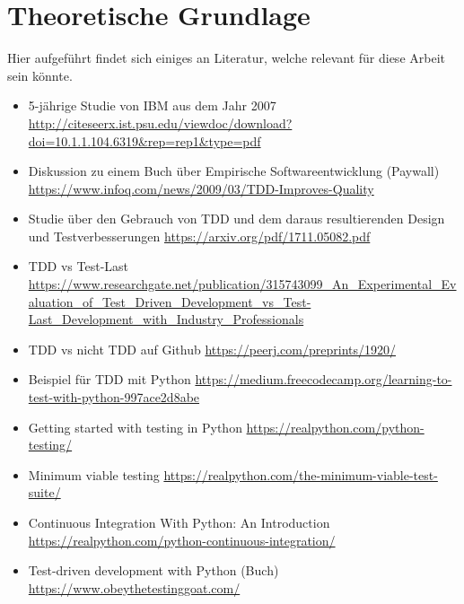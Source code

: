 \section{Theoretische Grundlage}
Hier aufgeführt findet sich einiges an Literatur, welche relevant für diese Arbeit
sein könnte.

\begin{itemize}
    \item 5-jährige Studie von IBM aus dem Jahr 2007
    \url{http://citeseerx.ist.psu.edu/viewdoc/download?doi=10.1.1.104.6319&rep=rep1&type=pdf}
    \item Diskussion zu einem Buch über Empirische Softwareentwicklung (Paywall)
    \url{https://www.infoq.com/news/2009/03/TDD-Improves-Quality}
    \item Studie über den Gebrauch von TDD und dem daraus resultierenden Design
    und Testverbesserungen
    \url{https://arxiv.org/pdf/1711.05082.pdf}
    \item TDD vs Test-Last
    \url{https://www.researchgate.net/publication/315743099_An_Experimental_Evaluation_of_Test_Driven_Development_vs_Test-Last_Development_with_Industry_Professionals}
    \item TDD vs nicht TDD auf Github
    \url{https://peerj.com/preprints/1920/}
    \item Beispiel für TDD mit Python
    \url{https://medium.freecodecamp.org/learning-to-test-with-python-997ace2d8abe}
    \item Getting started with testing in Python
    \url{https://realpython.com/python-testing/}
    \item Minimum viable testing
    \url{https://realpython.com/the-minimum-viable-test-suite/}
    \item Continuous Integration With Python: An Introduction
    \url{https://realpython.com/python-continuous-integration/}
    \item Test-driven development with Python (Buch)
    \url{https://www.obeythetestinggoat.com/}
\end{itemize}
